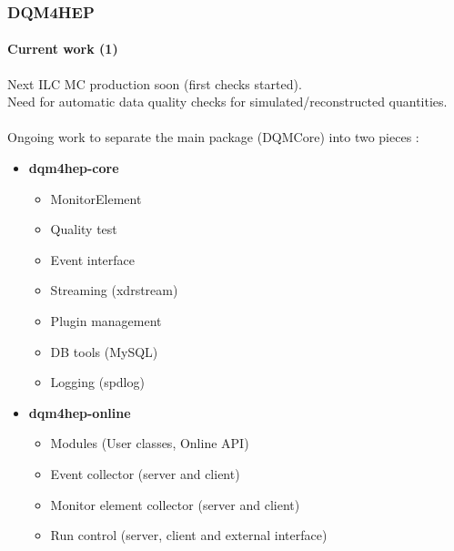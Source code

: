 \documentclass[presentation, 10pt]{beamer}
\begin{document}
\begin{frame}
  \frametitle{DQM4HEP}
  \framesubtitle{Current work (1)}
  \footnotesize
  Next ILC MC production soon (first checks started). \\
  Need for automatic data quality checks for simulated/reconstructed quantities. \\
  ~\\
  Ongoing work to separate the main package (DQMCore) into two pieces :
  \begin{itemize}
    \item \textbf{dqm4hep-core}
    \begin{itemize}
      \item MonitorElement
      \item Quality test
      \item Event interface
      \item Streaming (xdrstream)
      \item Plugin management
      \item DB tools (MySQL)
      \item Logging (spdlog)
    \end{itemize}
    \item \textbf{dqm4hep-online}
    \begin{itemize}
      \item Modules (User classes, Online API)
      \item Event collector (server and client)
      \item Monitor element collector (server and client)
      \item Run control (server, client and external interface)
    \end{itemize}
  \end{itemize}
  
\end{frame}
\end{document}
